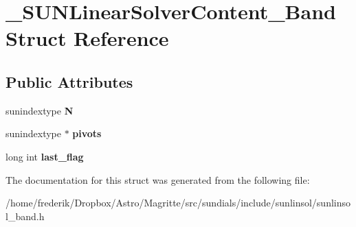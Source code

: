\hypertarget{struct__SUNLinearSolverContent__Band}{}\section{\+\_\+\+S\+U\+N\+Linear\+Solver\+Content\+\_\+\+Band Struct Reference}
\label{struct__SUNLinearSolverContent__Band}
\subsection*{Public Attributes}
\begin{DoxyCompactItemize}
\item 
\mbox{\label{struct__SUNLinearSolverContent__Band_a1c135a320268164946656dee48d05433}} 
sunindextype {\bfseries N}
\item 
\mbox{\label{struct__SUNLinearSolverContent__Band_abc27ea906662498664681736083c70d2}} 
sunindextype $\ast$ {\bfseries pivots}
\item 
\mbox{\label{struct__SUNLinearSolverContent__Band_a1095fb80a7a77f40b61332e568c87a58}} 
long int {\bfseries last\+\_\+flag}
\end{DoxyCompactItemize}


The documentation for this struct was generated from the following file\+:\begin{DoxyCompactItemize}
\item 
/home/frederik/\+Dropbox/\+Astro/\+Magritte/src/sundials/include/sunlinsol/sunlinsol\+\_\+band.\+h\end{DoxyCompactItemize}
